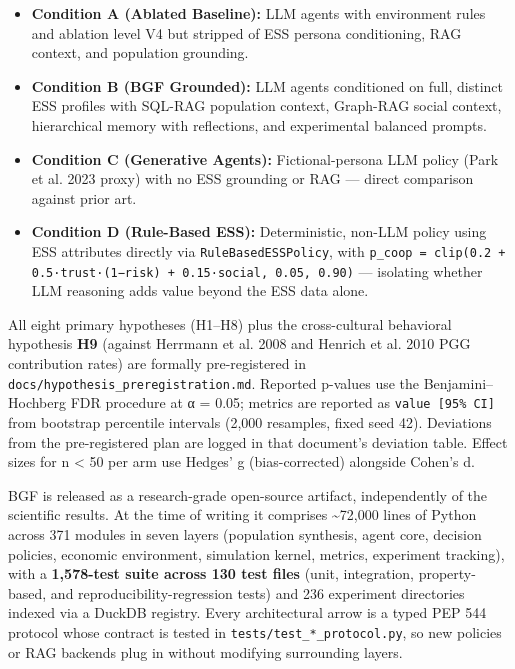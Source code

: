 \begin{itemize}
\item \textbf{Condition A (Ablated Baseline):} LLM agents with environment rules and ablation level V4 but stripped of ESS persona conditioning, RAG context, and population grounding.
\item \textbf{Condition B (BGF Grounded):} LLM agents conditioned on full, distinct ESS profiles with SQL-RAG population context, Graph-RAG social context, hierarchical memory with reflections, and experimental balanced prompts.
\item \textbf{Condition C (Generative Agents):} Fictional-persona LLM policy (Park et al. 2023 proxy) with no ESS grounding or RAG — direct comparison against prior art.
\item \textbf{Condition D (Rule-Based ESS):} Deterministic, non-LLM policy using ESS attributes directly via \texttt{RuleBasedESSPolicy}, with \texttt{p\_coop = clip(0.2 + 0.5·trust·(1−risk) + 0.15·social, 0.05, 0.90)} — isolating whether LLM reasoning adds value beyond the ESS data alone.
\end{itemize}

All eight primary hypotheses (H1–H8) plus the cross-cultural behavioral hypothesis \textbf{H9} (against Herrmann et al. 2008 and Henrich et al. 2010 PGG contribution rates) are formally pre-registered in \texttt{docs/hypothesis\_preregistration.md}. Reported p-values use the Benjamini–Hochberg FDR procedure at α = 0.05; metrics are reported as \texttt{value [95\% CI]} from bootstrap percentile intervals (2,000 resamples, fixed seed 42). Deviations from the pre-registered plan are logged in that document's deviation table. Effect sizes for n < 50 per arm use Hedges' g (bias-corrected) alongside Cohen's d.


BGF is released as a research-grade open-source artifact, independently of the scientific results. At the time of writing it comprises \textasciitilde{}72,000 lines of Python across 371 modules in seven layers (population synthesis, agent core, decision policies, economic environment, simulation kernel, metrics, experiment tracking), with a \textbf{1,578-test suite across 130 test files} (unit, integration, property-based, and reproducibility-regression tests) and 236 experiment directories indexed via a DuckDB registry. Every architectural arrow is a typed PEP 544 protocol whose contract is tested in \texttt{tests/test\_*\_protocol.py}, so new policies or RAG backends plug in without modifying surrounding layers.

